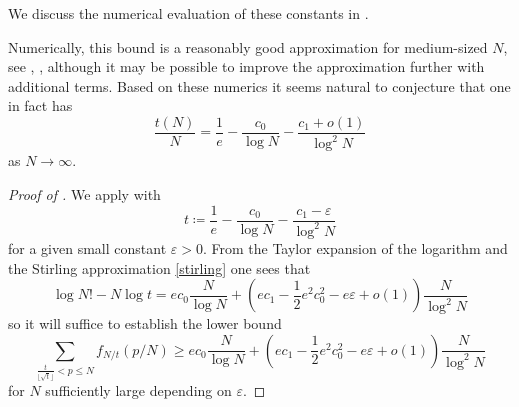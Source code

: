 \documentclass[10pt,a4paper,reqno]{amsart}
\numberwithin{equation}{section}
\theoremstyle{plain}
\theoremstyle{definition}
\newcommand\eps{\varepsilon}
\begin{document}
We discuss the numerical evaluation of these constants in .

  Numerically, this bound is a reasonably good approximation for medium-sized $N$, see , , although it may be possible to improve the approximation further with additional terms.  Based on these numerics it seems natural to conjecture that one in fact has
  $$\frac{t(N)}{N} = \frac{1}{e} - \frac{c_0}{\log N} - \frac{c_1 + o(1)}{\log^2 N}$$
as $N \to \infty$.
    
    \begin{proof}[Proof of ]
    We apply  with
      $$ t \coloneqq \frac{1}{e} - \frac{c_0}{\log N} - \frac{c_1-\eps}{\log^2 N}$$
    for a given small constant $\eps>0$.  From the Taylor expansion of the logarithm and the Stirling approximation \eqref{stirling} one sees that
    $$ \log N! - N \log t = ec_0 \frac{N}{\log N} + (ec_1 - \frac{1}{2} e^2 c_0^2 - e\eps+o(1)) \frac{N}{\log^2 N}$$
    so it will suffice to establish the lower bound
    \begin{equation}\label{targ-sum}
      \sum_{\frac{t}{\lfloor\sqrt{t}\rfloor} < p \leq N} f_{N/t}(p/N) \geq ec_0 \frac{N}{\log N} + (ec_1 - \frac{1}{2} e^2 c_0^2 - e \eps + o(1)) \frac{N}{\log^2 N}
    \end{equation}
    for $N$ sufficiently large depending on $\eps$.


\end{proof}
\end{document}
